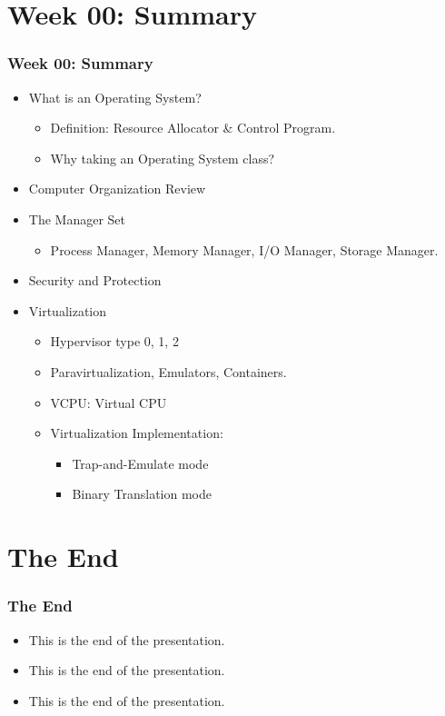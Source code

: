 \documentclass[xcolor=table, notheorems, hyperref={pdfpagelabels=false}]{beamer}
\begin{document}
\section{Week 00: Summary}
\begin{frame}
\frametitle{Week 00: Summary}
\begin{itemize}
\item What is an Operating System?
\begin{itemize}
\item Definition: Resource Allocator \& Control Program.
\item Why taking an Operating System class?
\end{itemize}
\item Computer Organization Review
\item The Manager Set
\begin{itemize}
\item Process Manager, Memory Manager, I/O Manager, Storage Manager.
\end{itemize}
\item Security and Protection
\item Virtualization
\begin{itemize}
\item Hypervisor type 0, 1, 2
\item Paravirtualization, Emulators, Containers.
\item VCPU: Virtual CPU
\item Virtualization Implementation:
\begin{itemize}
\item Trap-and-Emulate mode
\item Binary Translation mode
\end{itemize}
\end{itemize}
\end{itemize}
\end{frame}




\section{The End}
\begin{frame}
\frametitle{The End}
\begin{itemize}
\item[$\square$] This is the end of the presentation.
\item[$\boxtimes$] This is the end of the presentation.
\item This is the end of the presentation.
\end{itemize}
\end{frame}

\end{document}
